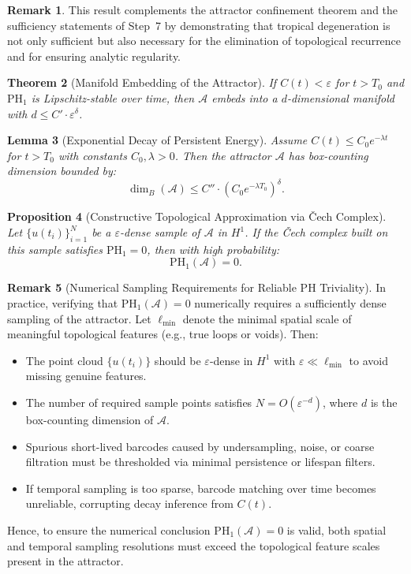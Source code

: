 \documentclass[11pt]{article}
\newtheorem{theorem}{Theorem}[section]
\newtheorem{lemma}[theorem]{Lemma}
\newtheorem{proposition}[theorem]{Proposition}
\theoremstyle{definition}
\newtheorem{remark}[theorem]{Remark}
\begin{document}
\begin{remark}
This result complements the attractor confinement theorem and the sufficiency statements of Step~7 by demonstrating that tropical degeneration is not only sufficient but also necessary for the elimination of topological recurrence and for ensuring analytic regularity.
\end{remark}

\begin{theorem}[Manifold Embedding of the Attractor]
If $C(t) < \varepsilon$ for $t > T_0$ and $\mathrm{PH}_1$ is Lipschitz-stable over time, then $\mathcal{A}$ embeds into a $d$-dimensional manifold with $d \le C' \cdot \varepsilon^\delta$.
\end{theorem}

\begin{lemma}[Exponential Decay of Persistent Energy]
\label{lem:exp-Ct}
Assume $C(t) \le C_0 e^{-\lambda t}$ for $t > T_0$ with constants $C_0, \lambda > 0$. Then the attractor $\mathcal{A}$ has box-counting dimension bounded by:
\[
\dim_B(\mathcal{A}) \le C'' \cdot (C_0 e^{-\lambda T_0})^\delta.
\]
\end{lemma}

\begin{proposition}[Constructive Topological Approximation via \v{C}ech Complex]
Let $\{u(t_i)\}_{i=1}^N$ be a $\varepsilon$-dense sample of $\mathcal{A}$ in $H^1$. If the \v{C}ech complex built on this sample satisfies $\mathrm{PH}_1 = 0$, then with high probability:
\[
\mathrm{PH}_1(\mathcal{A}) = 0.
\]
\end{proposition}

\begin{remark}[Numerical Sampling Requirements for Reliable PH Triviality]
In practice, verifying that $\mathrm{PH}_1(\mathcal{A}) = 0$ numerically requires a sufficiently dense sampling of the attractor. Let $\ell_{\min}$ denote the minimal spatial scale of meaningful topological features (e.g., true loops or voids). Then:

\begin{itemize}
    \item The point cloud $\{u(t_i)\}$ should be $\varepsilon$-dense in $H^1$ with $\varepsilon \ll \ell_{\min}$ to avoid missing genuine features.
    \item The number of required sample points satisfies $N = O(\varepsilon^{-d})$, where $d$ is the box-counting dimension of $\mathcal{A}$.
    \item Spurious short-lived barcodes caused by undersampling, noise, or coarse filtration must be thresholded via minimal persistence or lifespan filters.
    \item If temporal sampling is too sparse, barcode matching over time becomes unreliable, corrupting decay inference from $C(t)$.
\end{itemize}

Hence, to ensure the numerical conclusion $\mathrm{PH}_1(\mathcal{A}) = 0$ is valid, both spatial and temporal sampling resolutions must exceed the topological feature scales present in the attractor.
\end{remark}
\end{document}
